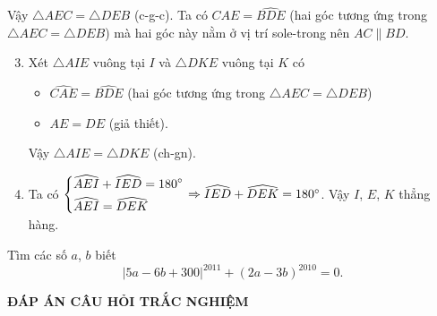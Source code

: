 \begin{ex}
{{
		}
			Vậy $\triangle AEC=\triangle DEB$ (c-g-c).
		Ta có $\widehat{CAE}=\widehat{BDE}$ (hai góc tương ứng trong $\triangle AEC=\triangle DEB$) mà hai góc này nằm ở vị trí sole-trong nên $AC\parallel BD$.
			\begin{enumerate}
				\setcounter{enumi}{2}
				\item Xét $\triangle AIE$ vuông tại $I$ và $\triangle DKE$ vuông tại $K$ có
				\begin{itemize}
					\item $\widehat{CAE}=\widehat{BDE}$ (hai góc tương ứng trong $\triangle AEC=\triangle DEB$) 
					\item $AE=DE$ (giả thiết).
				\end{itemize}
				Vậy $\triangle AIE=\triangle DKE$ (ch-gn).
				\item Ta có $\left\{\begin{aligned}&\widehat{AEI}+\widehat{IED}=180^\circ\\&\widehat{AEI}=\widehat{DEK}\end{aligned}\right.\Rightarrow \widehat{IED}+\widehat{DEK}=180^\circ$. Vậy $I$, $E$, $K$ thẳng hàng.
			\end{enumerate}
	}
	\end{ex}
\begin{ex}%
	Tìm các số $a$, $b$ biết
	\[|5a-6b+300|^{2011}+(2a-3b)^{2010}=0.\]
\end{ex}
	\begin{center}
		\textbf{ĐÁP ÁN CÂU HỎI TRẮC NGHIỆM}
	\end{center}
	\boxans
	